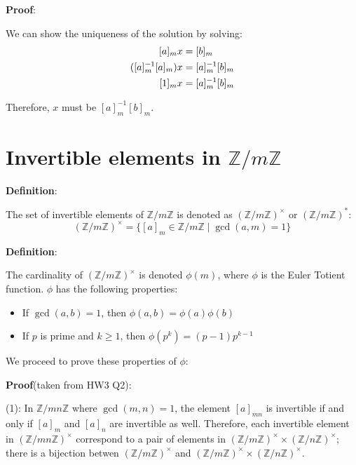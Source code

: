 \documentclass{article}
\begin{document}
\begin{multicols*}{2}
\textbf{Proof}:

We can show the uniqueness of the solution by solving:\[\begin{aligned} \relax
    [a]_m x &= [b]_m\\
    ([a]^{-1}_m[a]_m) x &= [a]^{-1}_m[b]_m\\
    [1]_m x &= [a]^{-1}_m[b]_m\\
\end{aligned}\]

Therefore, $x$ must be $[a]^{-1}_m[b]_m$.

\section{Invertible elements in $\mathbb{Z}/m\mathbb{Z}$}

\textbf{Definition}:

The set of invertible elements of $\mathbb{Z}/m\mathbb{Z}$ is denoted as $(\mathbb{Z}/m\mathbb{Z})^\times$ or $(\mathbb{Z}/m\mathbb{Z})^*$: \[(\mathbb{Z}/m\mathbb{Z})^\times = \{[a]_m \in \mathbb{Z}/m\mathbb{Z}\;|\; \gcd(a,m) = 1\}\]

\textbf{Definition}:

The cardinality of $(\mathbb{Z}/m\mathbb{Z})^\times$ is denoted $\phi(m)$, where $\phi$ is the Euler Totient function. $\phi$ has the following properties:
\begin{itemize}
    \item[(1)] If $\gcd(a, b) = 1$, then $\phi(a,b) = \phi(a)\phi(b)$
    \item[(2)] If $p$ is prime and $k \geq 1$, then $\phi(p^k) = (p-1)p^{k-1}$
\end{itemize}

We proceed to prove these properties of $\phi$:

\textbf{Proof}(taken from HW3 Q2):

(1): In $\mathbb{Z}/mn\mathbb{Z}$ where $\gcd(m,n) = 1$, the element $[a]_{mn}$ is invertible if and only if $[a]_m$ and $[a]_n$ are invertible as well. Therefore, each invertible element in $(\mathbb{Z}/mn\mathbb{Z})^\times$ correspond to a pair of elements in $(\mathbb{Z}/m\mathbb{Z})^\times \times (\mathbb{Z}/n\mathbb{Z})^\times$; there is a bijection betwen $(\mathbb{Z}/m\mathbb{Z})^\times$ and $(\mathbb{Z}/m\mathbb{Z})^\times \times (\mathbb{Z}/n\mathbb{Z})^\times$.


\end{multicols*}
\end{document}
